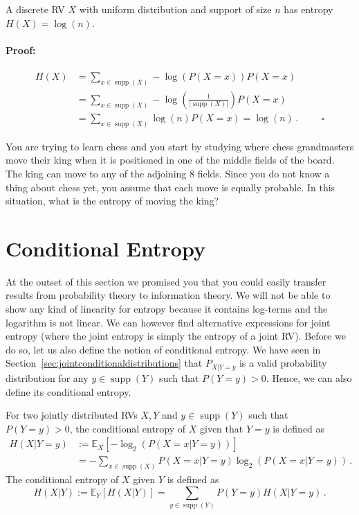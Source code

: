 \documentclass[a4paper,11pt,leqno]{report}\usepackage[]{graphicx}\usepackage[]{color}
\newcommand{\supp}{\operatorname{supp}}
\newcommand{\E}{\mathbb{E}}
\begin{document}
\begin{Theorem}
A discrete RV $ X $ with uniform distribution and support of size $ n $ has entropy
$ H(X) = \log(n) $.
\end{Theorem}

\paragraph{Proof:}
\begin{align}
H(X) &= \underset{x \in \supp(X)}{\sum}-\log(P(X=x))P(X=x) \\
&= \underset{x \in \supp(X)}{\sum} -\log(\frac{1}{|\supp(X)|})P(X=x) \\
&= \underset{x \in \supp(X)}{\sum}\log(n)P(X=x) = \log(n) \, .
\hspace{1cm} \square
\end{align}

\begin{Exercise}
You are trying to learn chess and you start by studying where chess grandmasters move their king when it
is positioned in one of the middle fields of the board. The king can move to any of the adjoining 8 fields. Since
you do not know a thing about chess yet, you assume that each move is equally probable. In this situation,
what is the entropy of moving the king?
\end{Exercise}

\section{Conditional Entropy}
At the outset of this section we promised you that you could easily transfer results from probability 
theory to information theory. We will not be able to show any kind of linearity for entropy because it contains
log-terms and the logarithm is not linear. We can however find alternative expressions for joint entropy (where 
the joint entropy is simply the entropy of a joint RV). Before we do so, let us also define the notion of 
conditional entropy. We have seen in Section~\ref{sec:jointconditionaldistributions} that $P_{X|Y=y}$ is a valid probability distribution for any $y \in \supp(Y)$ such that $P(Y=y)>0$. Hence, we can also define its conditional entropy.

\begin{Definition}
For two jointly distributed RVs $ X,Y $ and $y \in \supp(Y)$ such that $P(Y=y)>0$, the conditional entropy of $ X $ given that $ Y=y $ is defined as
\begin{align*}
H(X | Y=y) &:= \E_X[-\log_{2}(P(X=x | Y=y))] \\
&= - \!\! \sum_{x \in \supp(X)} P(X=x | Y=y) \log_2(P(X=x | Y=y))\, . 
\end{align*}
The conditional entropy of $X$ given $Y$ is defined as
$$ H(X | Y) := \E_Y[ H(X | Y) ] = \sum_{y \in \supp(Y)} P(Y=y) H(X | Y=y) \, .$$
\end{Definition}
\end{document}

